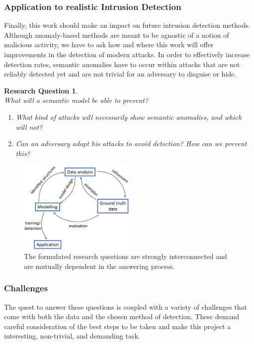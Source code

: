\documentclass[a4paper,12pt,twoside]{report}
\newtheorem{rquestion}{Research Question}
\begin{document}
\subsubsection{Application to realistic Intrusion Detection}

Finally, this work should make an impact on future intrusion detection methods. Although anomaly-based methods are meant to be agnostic of a notion of malicious activity, we have to ask how and where this work will offer improvements in the detection of modern attacks. In order to effectively increase detection rates, semantic anomalies have to occur within attacks that are not reliably detected yet and are not trivial for an adversary to disguise or hide. 

\begin{rquestion}\ \\
What will a semantic model be able to prevent? 
\begin{enumerate}
\item What kind of attacks will necessarily show semantic anomalies, and which will not?
\item Can an adversary adapt his attacks to avoid detection? How can we prevent this?
\end{enumerate}
\end{rquestion}



\begin{figure}\label{RQs}
\centering
\includegraphics[width=0.5\textwidth]{images/RQ.png}
\caption{The formulated research questions are strongly interconnected and are mutually dependent in the answering process.}
\end{figure}


\subsubsection{Challenges}

The quest to answer these questions is coupled with a variety of challenges that come with both the data and the chosen method of detection. These demand careful consideration of the best steps to be taken and make this project a interesting, non-trivial, and demanding task. 
\end{document}
